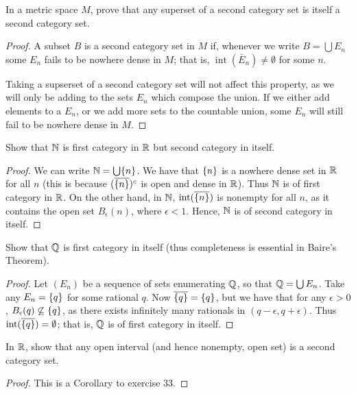 \begin{exercise}{29}
In a metric space $M$, prove that any superset of a second category set is itself a second category set.
\end{exercise}
\begin{proof}
A subset $B$ is a second category set in $M$ if, whenever we write $B = \bigcup E_n$ some $E_n$ fails to be nowhere dense in $M$;
that is, $\operatorname{int}(\bar{E}_n) \neq \emptyset$ for some $n$.

Taking a supserset of a second category set will not affect this property, as we will only be adding to the sets $E_n$ which compose the union.
If we either add elements to a $E_n$, or we add more sets to the countable union, some $E_n$ will still fail to be nowhere dense in $M$.
\end{proof} 

\begin{exercise}{30}
Show that $\mathbb{N}$ is first category in $\mathbb{R}$ but second category in itself.
\end{exercise}
\begin{proof}
We can write $\mathbb{N} = \bigcup \{n\}$.
We have that $\{n\}$ is a nowhere dense set in $\mathbb{R}$ for all $n$ (this is because $(\overline{\{n\}})^c$ is open and dense in $\mathbb{R}$).
Thus $\mathbb{N}$ is of first category in $\mathbb{R}$.
On the other hand, in $\mathbb{N}$, $\operatorname{int}(\overline{\{n\}})$ is nonempty for all $n$, as it contains the open set $B_\epsilon(n)$, where $\epsilon < 1$.
Hence, $\mathbb{N}$ is of second category in itself.
\end{proof} 

\begin{exercise}{31}
Show that $\mathbb{Q}$ is first category in itself (thus completeness is essential in Baire's Theorem).
\end{exercise}
\begin{proof}
Let $(E_n)$ be a sequence of sets enumerating $\mathbb{Q}$, so that $\mathbb{Q} = \bigcup E_n$.
Take any $E_n = \{q\}$ for some rational $q$.
Now $\overline{\{q\}} = \{q\}$, but we have that for any $\epsilon > 0$, $B_\epsilon(q) \not\subseteq \{q\}$, as there exists infinitely many rationals in $(q-\epsilon, q+\epsilon)$.
Thus $\operatorname{int}(\overline{\{q\}}) = \emptyset$;
that is, $\mathbb{Q}$ is of first category in itself.
\end{proof} 

\begin{exercise}{32}
In $\mathbb{R}$, show that any open interval (and hence nonempty, open set) is a second category set.
\end{exercise}
\begin{proof}
This is a Corollary to exercise 33.
\end{proof} 

